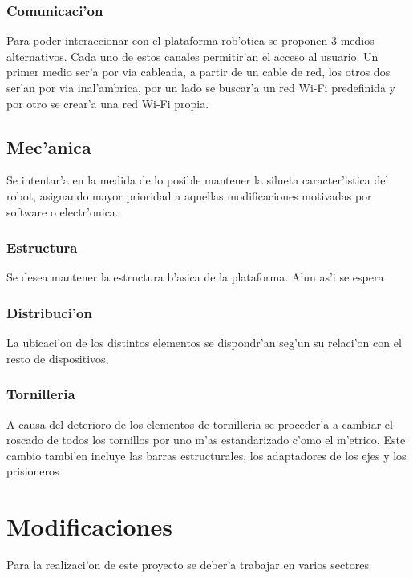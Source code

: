 \documentclass[twoside]{article}
\begin{document}
\subsubsection{Comunicaci'on}  
Para poder interaccionar con el plataforma rob'otica se proponen 3 medios alternativos. Cada uno de estos canales permitir'an el acceso al usuario. Un primer medio ser'a por via cableada, a partir de un cable de red, los otros dos ser'an por via inal'ambrica, por un lado se buscar'a un red Wi-Fi predefinida y por otro se crear'a una red Wi-Fi propia. 

\subsection{Mec'anica}
Se intentar'a en la medida de lo posible mantener la silueta caracter'istica del robot, asignando mayor prioridad a aquellas modificaciones motivadas por software o  electr'onica. 

\subsubsection{Estructura}
Se desea mantener la estructura b'asica de la plataforma. A'un as'i se espera 

\subsubsection{Distribuci'on} 
La ubicaci'on de los distintos elementos se dispondr'an seg'un su relaci'on con el resto de dispositivos, 


\subsubsection{Tornilleria}
A causa del deterioro de los elementos de tornilleria se proceder'a a cambiar el roscado de todos los tornillos por uno m'as estandarizado c'omo el m'etrico. Este cambio tambi'en incluye las barras estructurales, los adaptadores de los ejes y los prisioneros



\newpage
\section{Modificaciones}
Para la realizaci'on de este proyecto se deber'a trabajar en varios sectores 
\end{document}
